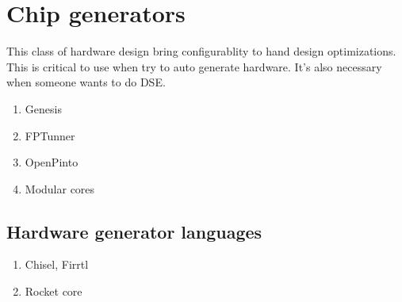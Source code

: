 \section{Chip generators}

This class of hardware design bring configurablity to hand design optimizations. This is critical to use when try to auto generate hardware.
It's also necessary when someone wants to do DSE.
\begin{enumerate}
    \item Genesis
    \item FPTunner
    \item OpenPinto
    \item Modular cores
\end{enumerate}

\subsection{Hardware generator languages}
\begin{enumerate}
    \item Chisel, Firrtl
    \item Rocket core
\end{enumerate}